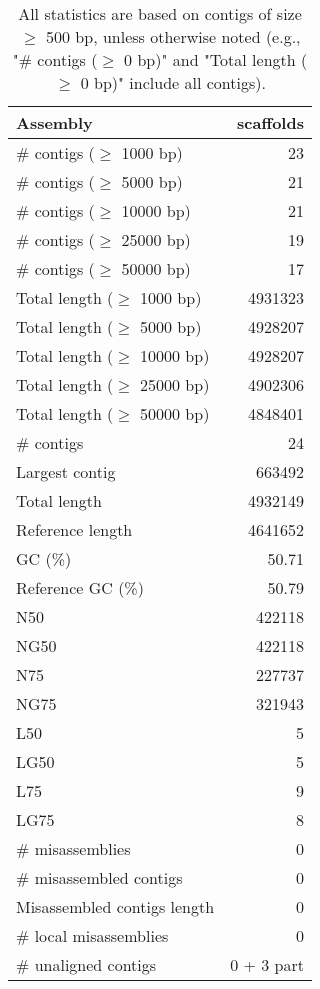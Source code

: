 \documentclass[12pt,a4paper]{article}
\begin{document}
\begin{table}[ht]
\begin{center}
\caption{All statistics are based on contigs of size $\geq$ 500 bp, unless otherwise noted (e.g., "\# contigs ($\geq$ 0 bp)" and "Total length ($\geq$ 0 bp)" include all contigs).}
\begin{tabular}{|l*{1}{|r}|}
\hline
Assembly & scaffolds \\ \hline
\# contigs ($\geq$ 1000 bp) & 23 \\ \hline
\# contigs ($\geq$ 5000 bp) & 21 \\ \hline
\# contigs ($\geq$ 10000 bp) & 21 \\ \hline
\# contigs ($\geq$ 25000 bp) & 19 \\ \hline
\# contigs ($\geq$ 50000 bp) & 17 \\ \hline
Total length ($\geq$ 1000 bp) & 4931323 \\ \hline
Total length ($\geq$ 5000 bp) & 4928207 \\ \hline
Total length ($\geq$ 10000 bp) & 4928207 \\ \hline
Total length ($\geq$ 25000 bp) & 4902306 \\ \hline
Total length ($\geq$ 50000 bp) & 4848401 \\ \hline
\# contigs & 24 \\ \hline
Largest contig & 663492 \\ \hline
Total length & 4932149 \\ \hline
Reference length & 4641652 \\ \hline
GC (\%) & 50.71 \\ \hline
Reference GC (\%) & 50.79 \\ \hline
N50 & 422118 \\ \hline
NG50 & 422118 \\ \hline
N75 & 227737 \\ \hline
NG75 & 321943 \\ \hline
L50 & 5 \\ \hline
LG50 & 5 \\ \hline
L75 & 9 \\ \hline
LG75 & 8 \\ \hline
\# misassemblies & 0 \\ \hline
\# misassembled contigs & 0 \\ \hline
Misassembled contigs length & 0 \\ \hline
\# local misassemblies & 0 \\ \hline
\# unaligned contigs & 0 + 3 part \\ \hline

\end{tabular}
\end{center}
\end{table}
\end{document}
